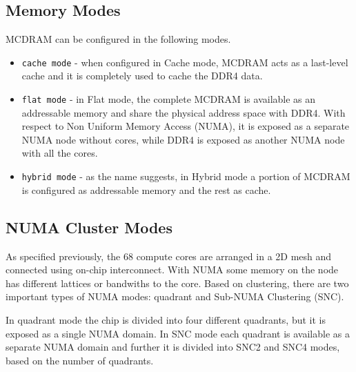 \subsection{Memory Modes}
\label{src:knl/config}
MCDRAM can be configured in the following modes.
\begin{itemize}
    \item \texttt{cache mode} - when configured in Cache mode,
    MCDRAM acts as a last-level cache and it is completely used to
    cache the DDR4 data. %
    \item \texttt{flat mode} - in Flat mode, the complete
    MCDRAM is available as an addressable memory and share the
    physical address space with DDR4. With respect to Non Uniform
    Memory Access (NUMA), it is exposed as a separate NUMA node
    without cores, while DDR4 is exposed as another NUMA node with
    all the cores.
    \item \texttt{hybrid mode} - as the name suggests, in
    Hybrid mode a portion of MCDRAM is configured as addressable
    memory and the rest as cache.
\end{itemize}

\subsection{NUMA Cluster Modes}
\label{src:knl/cluster}
As specified previously, the 68 compute cores are arranged in a 2D
mesh and connected using on-chip interconnect. With NUMA some memory
on the node has different lattices or bandwiths to the core. Based on
clustering, there are two important types of NUMA modes: quadrant and
Sub-NUMA Clustering (SNC).

In quadrant mode the chip is divided into four different quadrants, but
it is exposed as a single NUMA domain. In SNC mode each quadrant is
available as a separate NUMA domain and further it is divided into SNC2
and SNC4 modes, based on the number of quadrants.

